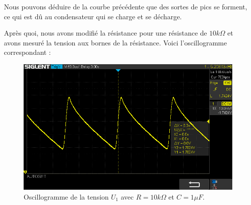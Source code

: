 Nous pouvons déduire de la courbe précédente que des sortes de pics se forment, ce qui est dû au condensateur qui se charge et se décharge.

Après quoi, nous avons modifié la résistance pour une résistance de $10k\Omega$ et avons mesuré la tension aux bornes de la résistance. Voici l'oscillogramme correspondant :

\begin{figure}[H]
    \begin{center}
    \includegraphics[scale=0.5]{images/Oscillo/SDS00004.png}
    \caption{Oscillogramme de la tension $U_1$ avec $R=10k\Omega$ et $C=1\mu F$.}
    \end{center}
\end{figure}


